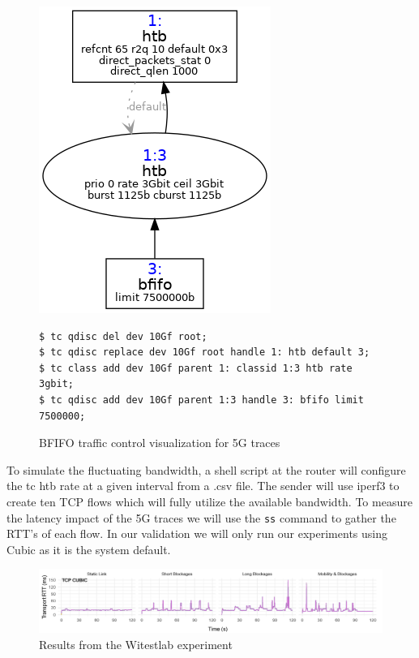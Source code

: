 \documentclass[a4paper,english, 11pt]{report}
\begin{document}
\begin{figure}[h!] %
	\centering
	\includegraphics[scale=0.60]{../diagrams/tc/tc_5g_bfifo.png}
  	\begin{verbatim}
$ tc qdisc del dev 10Gf root; 
$ tc qdisc replace dev 10Gf root handle 1: htb default 3;
$ tc class add dev 10Gf parent 1: classid 1:3 htb rate 3gbit;
$ tc qdisc add dev 10Gf parent 1:3 handle 3: bfifo limit 7500000;
	\end{verbatim}
	\caption{BFIFO traffic control visualization for 5G traces}
  	\label{fig:tc_5g_bfifo}
\end{figure}

To simulate the fluctuating bandwidth, a shell script at the router will configure the tc htb rate at a given interval from a .csv file. The sender will use iperf3 to create ten TCP flows which will fully utilize the available bandwidth. To measure the latency impact of the 5G traces we will use the \verb|ss| command to gather the RTT's of each flow. In our validation we will only run our experiments using Cubic as it is the system default.\\


\begin{figure}[h!] %
	\centering
	\includegraphics[scale=0.3]{../diagrams/witestlab/witestlab_results.png}
  	\caption{Results from the Witestlab experiment~\cite{Srivastava_Fund_Panwar_2020}}
  	\label{fig:witestlab_results}
\end{figure}
\end{document}
